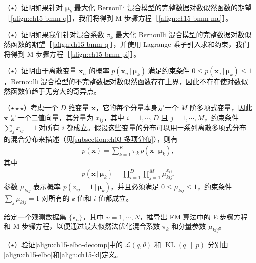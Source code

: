 \documentclass[../../main.tex]{subfiles}
\begin{document}
\begin{exercise}\label{exercise:ch15-17}
（$\star$）证明如果针对 $\bm{\mu}_k$ 最大化 Bernoulli 混合模型的完整数据对数似然函数的期望［\eqref{align:ch15-bmm-q}］，我们将得到 M 步骤方程［\eqref{align:ch15-bmm-mu}］。
\end{exercise}

\begin{exercise}\label{exercise:ch15-18}
（$\star$）证明如果我们针对混合系数 $\pi_k$ 最大化 Bernoulli 混合模型的完整数据对数似然函数的期望［\eqref{align:ch15-bmm-q}］，并使用 Lagrange 乘子引入求和约束，我们将得到 M 步骤方程［\eqref{align:ch15-bmm-pi}］。
\end{exercise}

\begin{exercise}\label{exercise:ch15-19}
（$\star$）证明由于离散变量 $\bm{x}_n$ 的概率 $p(\bm{x}_n\,|\,\bm{\mu}_k)$ 满足约束条件 $0\leqslant p(\bm{x}_n\,|\,\bm{\mu}_k)\leqslant1$，Bernoulli 混合模型的不完整数据对数似然函数存在上界，因此不存在使对数似然函数值趋于无穷大的奇异点。
\end{exercise}

\begin{exercise}\label{exercise:ch15-20}
（$\star\star\star$）考虑一个 $D$ 维变量 $\bm{x}$，它的每个分量本身是一个 $M$ 阶多项式变量，因此 $\bm{x}$ 是一个二值向量，其分量为 $x_{ij}$，其中 $i=1,\cdots,D$ 且 $j=1,\cdots,M$，约束条件 $\sum_jx_{ij}=1$ 对所有 $i$ 都成立。假设这些变量的分布可以用一系列离散多项式分布的混合分布来描述（见\cref{subsection:ch03-多项分布}），则有
\begin{align}
p(\bm{x})=\sum_{k=1}^{K}\pi_k\,p(\bm{x}\,|\,\bm{\mu}_k),
\label{align:ch15-ex-polymix}
\end{align}
其中
\begin{align}
p(\bm{x}\,|\,\bm{\mu}_k)=\prod_{i=1}^{D}\prod_{j=1}^{M}\mu_{kij}^{x_{ij}}.
\label{align:ch15-ex-polycomp}
\end{align}
参数 $\mu_{kij}$ 表示概率 $p(x_{ij}=1\,|\,\bm{\mu}_k)$，并且必须满足 $0\leqslant\mu_{kij}\leqslant1$，约束条件 $\sum_j\mu_{kij}=1$ 对所有的 $k$ 值和 $i$ 值都成立。

给定一个观测数据集 $\{\bm{x}_n\}$，其中 $n=1,\cdots,N$，推导出 EM 算法中的 E 步骤方程和 M 步骤方程，以便通过最大似然法优化混合系数 $\pi_k$ 和分量参数 $\mu_{kij}$。
\end{exercise}

\begin{exercise}\label{exercise:ch15-21}
（$\star$）验证\eqref{align:ch15-elbo-decomp}中的 $\mathcal{L}(q,\theta)$ 和 $\operatorname{KL}(q\,\|\,p)$ 分别由\eqref{align:ch15-elbo}和\eqref{align:ch15-kl}定义。
\end{exercise}
\end{document}
